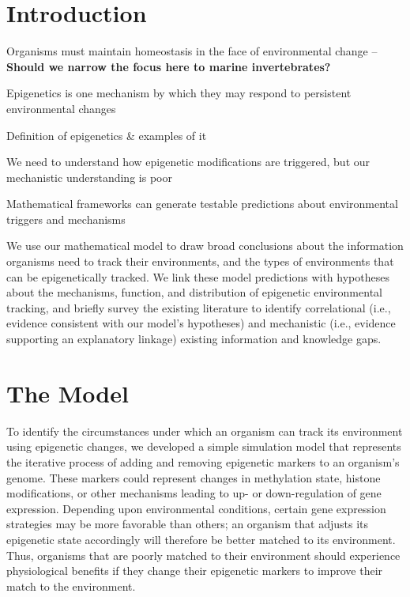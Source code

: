 \documentclass{article}
\begin{document}
\clearpage

\section*{Introduction}

Organisms must maintain homeostasis in the face of environmental change -- \textbf{Should we narrow the focus here to marine invertebrates?}

Epigenetics is one mechanism by which they may respond to persistent environmental changes

Definition of epigenetics \& examples of it

We need to understand how epigenetic modifications are triggered, but our mechanistic understanding is poor

Mathematical frameworks can generate testable predictions about environmental triggers and mechanisms


We use our mathematical model to draw broad conclusions about the information organisms need to track their environments, and the types of environments that can be epigenetically tracked. We link these model predictions with hypotheses about the mechanisms, function, and distribution of epigenetic environmental tracking, and briefly survey the existing literature to identify correlational (i.e., evidence consistent with our model's hypotheses) and mechanistic (i.e., evidence supporting an explanatory linkage) existing information and knowledge gaps.


\section*{The Model}
To identify the circumstances under which an organism can track its environment using epigenetic changes, we developed a simple simulation model that represents the iterative process of adding and removing epigenetic markers to an organism's genome. These markers could represent changes in methylation state, histone modifications, or other mechanisms leading to up- or down-regulation of gene expression. Depending upon environmental conditions, certain gene expression strategies may be more favorable than others; an organism that adjusts its epigenetic state accordingly will therefore be better matched to its environment. Thus, organisms that are poorly matched to their environment should experience physiological benefits if they change their epigenetic markers to improve their match to the environment.
\end{document}
